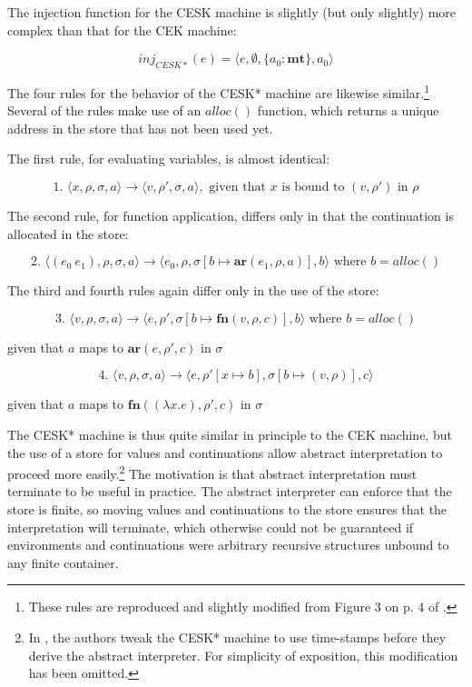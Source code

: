 \documentclass{article}
\begin{document}
The injection function for the CESK machine is slightly (but only slightly) more complex than that for the CEK machine:

$$ inj_{CESK*}(e) = \langle e, \emptyset, \{ a_0: \textbf{mt} \}, a_0 \rangle $$

The four rules for the behavior of the CESK* machine are likewise similar.\footnote{These rules are reproduced and slightly modified from Figure 3 on p. 4 of \cite{aam}.} Several of the rules make use of an $alloc()$ function, which returns a unique address in the store that has not been used yet.

The first rule, for evaluating variables, is almost identical:

$$ \text{1. } \langle x, \rho, \sigma, a \rangle \to \langle v, \rho', \sigma, a \rangle, \text{ given that $x$ is bound to $(v, \rho')$ in $\rho$} $$

The second rule, for function application, differs only in that the continuation is allocated in the store:

$$ \text{2. } \langle (e_0\ e_1), \rho, \sigma, a \rangle \to \langle e_0, \rho, \sigma[b \mapsto \textbf{ar}(e_1, \rho, a)], b \rangle \text{ where $b = alloc()$} $$

The third and fourth rules again differ only in the use of the store:

$$ \text{3. } \langle v, \rho, \sigma, a \rangle \to \langle e, \rho', \sigma[b \mapsto \textbf{fn}(v, \rho, c)], b \rangle \text{ where $b = alloc()$} $$
\begin{center}
	given that $a$ maps to $\textbf{ar}(e, \rho', c)$ in $\sigma$
\end{center}

$$ \text{4. } \langle v, \rho, \sigma, a \rangle \to \langle e, \rho'[x \mapsto b], \sigma[b \mapsto (v, \rho)], c \rangle $$
\begin{center}
	given that $a$ maps to $\textbf{fn}((\lambda x.e), \rho', c)$ in $\sigma$
\end{center}

The CESK* machine is thus quite similar in principle to the CEK machine, but the use of a store for values and continuations allow abstract interpretation to proceed more easily.\footnote{In \cite{aam}, the authors tweak the CESK* machine to use time-stamps before they derive the abstract interpreter. For simplicity of exposition, this modification has been omitted.} The motivation is that abstract interpretation must terminate to be useful in practice. The abstract interpreter can enforce that the store is finite, so moving values and continuations to the store ensures that the interpretation will terminate, which otherwise could not be guaranteed if environments and continuations were arbitrary recursive structures unbound to any finite container.
\end{document}
